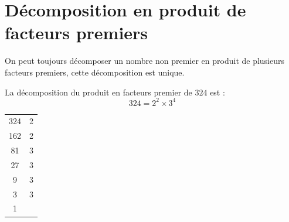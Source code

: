 \documentclass[a4paper,10pt]{report}
\begin{document}
\vspace{-2mm}
\section{Décomposition en produit de facteurs premiers}

\vspace{-5mm}
\noindent \begin{minipage}{14cm}

\begin{prop}
On peut toujours décomposer un nombre non premier en produit de plusieurs facteurs premiers, cette décomposition est unique.
\end{prop}

\begin{ex}
La décomposition du produit en facteurs premier de $324$ est : $$324 = 2^2 \times 3^4$$
\end{ex}
\end{minipage}
\hspace{5mm}
\begin{minipage}{6cm}
\begin{tabular}{c|c}
324 & 2 \\
162 & 2 \\
81 & 3 \\
27 & 3 \\
9 & 3 \\
3 & 3 \\
1 &  \\
\end{tabular}
\end{minipage}
\end{document}
